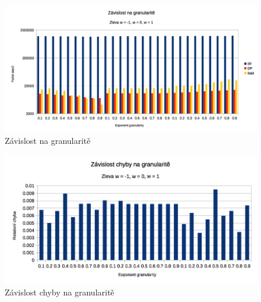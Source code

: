 \documentclass[a4paper]{article}
\begin{document}
		\begin{landscape}
			\begin{figure}[h]\centering
				\includegraphics[height=0.94\textwidth]{states-granularity.png} 
				\caption{Závislost na granularitě}
				\label{states-granularity}
			\end{figure}

			\begin{figure}[h]\centering
				\includegraphics[height=0.94\textwidth]{err-granularity.png} 
				\caption{Závislost chyby na granularitě}
				\label{err-granularity}
			\end{figure}
		\end{landscape}
		
\end{document}
